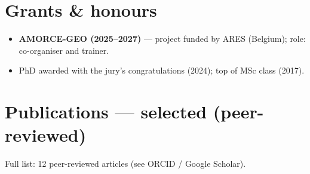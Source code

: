 \documentclass[10.5pt,a4paper]{article}
\begin{document}
\section{Grants \& honours}
\begin{itemize}
\item \textbf{AMORCE-GEO (2025–2027)} — project funded by ARES (Belgium); role: co-organiser and trainer.
\item PhD awarded with the jury's congratulations (2024); top of MSc class (2017).
\end{itemize}

\section{Publications — selected (peer-reviewed)}
{\small\color{grey}Full list: 12 peer-reviewed articles (see ORCID / Google Scholar).}
\end{document}
